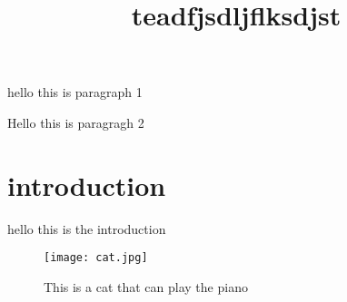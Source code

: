 \documentclass[a4paper, 12pt]{scrbook}
\title{teadfjsdljflksdjst}
\begin{document}
\tableofcontents


hello this is paragraph 1



Hello this is paragragh 2


\chapter{introduction}

hello this is the introduction

\begin{figure}
\texttt{[image: cat.jpg]}
\caption{This is a cat that can play the piano}
\end{figure}
\end{document}
